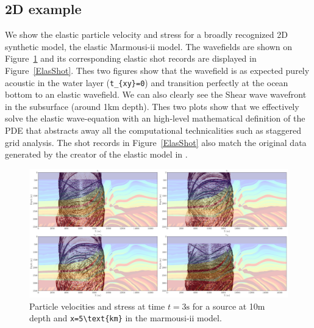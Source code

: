 \documentclass[conference]{IEEEtran}
\begin{document}
\subsection{2D example}\label{d-example}

We show the elastic particle velocity and stress for a broadly
recognized 2D synthetic model, the elastic
Marmousi-ii\cite{versteeg927, marmouelas} model. The wavefields are
shown on Figure~\ref{ElasWf} and its corresponding elastic shot records
are displayed in Figure~\ref{ElasShot}. Thes two figures show that the
wavefield is as expected purely acoustic in the water layer
(\texttt{t\_\{xy\}=0}) and transition perfectly at the ocean bottom to
an elastic wavefield. We can also clearly see the Shear wave wavefront
in the subsurface (around 1km depth). Thes two plots show that we
effectively solve the elastic wave-equation with an high-level
mathematical definition of the PDE that abstracts away all the
computational technicalities such as staggered grid analysis. The shot
records in Figure~\ref{ElasShot} also match the original data generated
by the creator of the elastic model in \cite{marmouelas}.

\begin{figure}
\centering
\includegraphics[width=1.000\hsize]{./Figures/marmou_snap.png}
\caption{Particle velocities and stress at time $t=3\text{s}$ for a
source at 10m depth and \texttt{x=5\textbackslash{}text\{km\}} in the
marmousi-ii model.}\label{ElasWf}
\end{figure}
\end{document}
